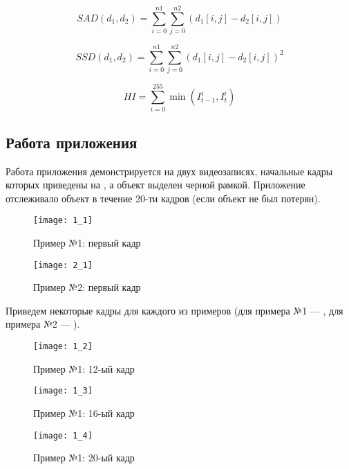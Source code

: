 \begin{equation}
	SAD(d_1,d_2) = \sum_{i=0}^{n1}\sum_{j=0}^{n2}(d_1[i,j] - d_2[i,j])
\end{equation}

\begin{equation}
	SSD(d_1,d_2) = \sum_{i=0}^{n1}\sum_{j=0}^{n2}(d_1[i,j] - d_2[i,j])^2
\end{equation}

\begin{equation}
	HI = \sum_{i=0}^{255}\min(I_{t-1}^i, I_{t}^i)
\end{equation}

\subsection{Работа приложения}

Работа приложения демонстрируется на двух видеозаписях, начальные кадры которых приведены на , а объект выделен черной рамкой. Приложение отслеживало объект в течение 20-ти кадров (если объект не был потерян).

\begin{figure}[H]
	\centering
	\texttt{[image: 1\_1]}
	\caption{Пример №1: первый кадр}
	\label{pic:1_1}
\end{figure}

\begin{figure}[H]
	\centering
	\texttt{[image: 2\_1]}
	\caption{Пример №2: первый кадр}
	\label{pic:2_1}
\end{figure}

Приведем некоторые кадры для каждого из примеров (для примера №1 --- , для примера №2 --- ).

\begin{figure}[H]
	\centering
	\texttt{[image: 1\_2]}
	\caption{Пример №1: 12-ый кадр}
	\label{pic:1_2}
\end{figure}

\begin{figure}[H]
	\centering
	\texttt{[image: 1\_3]}
	\caption{Пример №1: 16-ый кадр}
	\label{pic:1_3}
\end{figure}

\begin{figure}[H]
	\centering
	\texttt{[image: 1\_4]}
	\caption{Пример №1: 20-ый кадр}
	\label{pic:1_4}
\end{figure}

